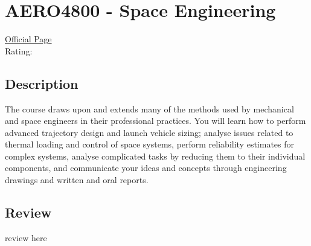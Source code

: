 \hypertarget{AERO4800}{\section{AERO4800 - Space Engineering}}

\large
\textcolor{turbo_purple}{\href{https://my.uq.edu.au/programs-courses/course.html?course_code=AERO4800}{Official Page}} \\
Rating: \cstar\cstar\cstar\cstar\ostar

\normalsize
\subsection*{Description}
The course draws upon and extends many of the methods used by mechanical and space engineers in their professional practices.
You will learn how to perform advanced trajectory design and launch vehicle sizing; analyse issues related to thermal loading and control of space systems, perform reliability estimates for complex systems, analyse complicated tasks by reducing them to their individual components, and communicate your ideas and concepts through engineering drawings and written and oral reports.

\subsection*{Review}
review here
